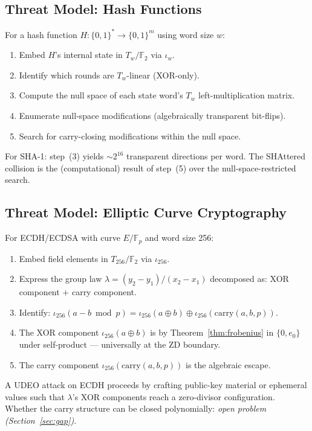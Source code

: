 \documentclass[runningheads]{llncs}
\theoremstyle{plain}
\theoremstyle{definition}
\newcommand{\GFtwo}{\mathbb{F}_2}
\newcommand{\Fp}{\mathbb{F}_p}
\begin{document}
\subsection{Threat Model: Hash Functions}

For a hash function $H: \{0,1\}^* \to \{0,1\}^m$ using word size $w$:

\begin{enumerate}
\item Embed $H$'s internal state in $T_w/\GFtwo$ via $\iota_w$.
\item Identify which rounds are $T_w$-linear (XOR-only).
\item Compute the null space of each state word's $T_w$ left-multiplication matrix.
\item Enumerate null-space modifications (algebraically transparent bit-flips).
\item Search for carry-closing modifications within the null space.
\end{enumerate}

For SHA-1: step~(3) yields $\sim 2^{16}$ transparent directions per word.
The SHAttered collision is the (computational) result of step~(5) over
the null-space-restricted search.

\subsection{Threat Model: Elliptic Curve Cryptography}

For ECDH/ECDSA with curve $E / \Fp$ and word size 256:

\begin{enumerate}
\item Embed field elements in $T_{256}/\GFtwo$ via $\iota_{256}$.
\item Express the group law $\lambda = (y_2 - y_1)/(x_2 - x_1)$ decomposed as:
      XOR component $+$ carry component.
\item Identify: $\iota_{256}(a - b \bmod p) = \iota_{256}(a \oplus b) \oplus \iota_{256}(\mathrm{carry}(a,b,p))$.
\item The XOR component $\iota_{256}(a \oplus b)$ is by Theorem~\ref{thm:frobenius}
      in $\{0, e_0\}$ under self-product — universally at the ZD boundary.
\item The carry component $\iota_{256}(\mathrm{carry}(a,b,p))$ is the algebraic escape.
\end{enumerate}

A UDEO attack on ECDH proceeds by crafting public-key material or ephemeral
values such that $\lambda$'s XOR components reach a zero-divisor configuration.
Whether the carry structure can be closed polynomially: \emph{open problem
(Section~\ref{sec:gap})}.
\end{document}
